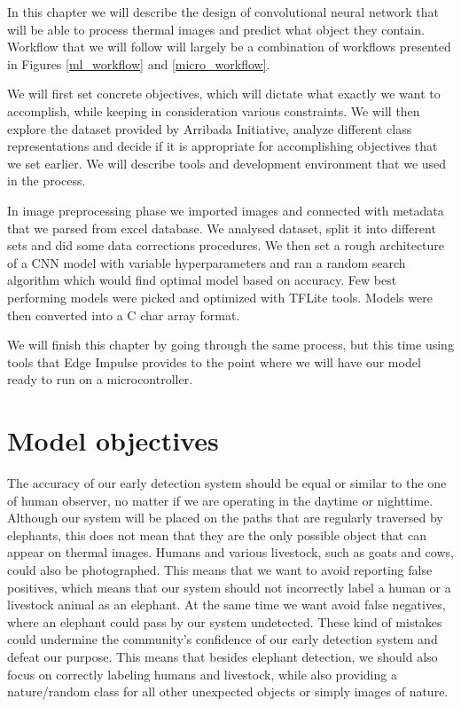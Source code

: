 In this chapter we will describe the design of convolutional neural network that will be able to process thermal images and predict what object they contain.
Workflow that we will follow will largely be a combination of workflows presented in Figures \ref{ml_workflow} and \ref{micro_workflow}.

We will first set concrete objectives, which will dictate what exactly we want to accomplish, while keeping in consideration various constraints.
We will then explore the dataset provided by Arribada Initiative, analyze different class representations and decide if it is appropriate for accomplishing objectives that we set earlier.
We will describe tools and development environment that we used in the process.

In image preprocessing phase we imported images and connected with metadata that we parsed from excel database.
We analysed dataset, split it into different sets and did some data corrections procedures.
We then set a rough architecture of a CNN model with variable hyperparameters and ran a random search algorithm which would find optimal model based on accuracy.
Few best performing models were picked and optimized with TFLite tools.
Models were then converted into a C char array format. 

We will finish this chapter by going through the same process, but this time using tools that Edge Impulse provides to the point where we will have our model ready to run on a microcontroller.


\section{ Model objectives}

The accuracy of our early detection system should be equal or similar to the one of human observer, no matter if we are operating in the daytime or nighttime.
Although our system will be placed on the paths that are regularly traversed by elephants, this does not mean that they are the only possible object that can appear on thermal images.
Humans and various livestock, such as goats and cows, could also be photographed.
This means that we want to avoid reporting false positives, which means that our system should not incorrectly label a human or a livestock animal as an elephant.
At the same time we want avoid false negatives, where an elephant could pass by our system undetected.
These kind of mistakes could undermine the community's confidence of our early detection system and defeat our purpose.
This means that besides elephant detection, we should also focus on correctly labeling humans and livestock, while also providing a nature/random class for all other unexpected objects or simply images of nature.

